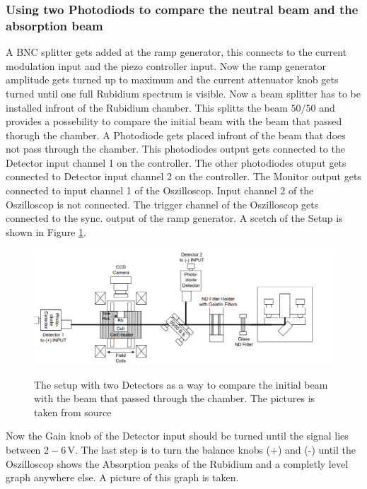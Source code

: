 \subsubsection{Using two Photodiods to compare the neutral beam and the absorption beam}
\label{sec:absorption_spectrum}
A BNC splitter gets added at the ramp generator, this connects to the current modulation input and the piezo controller input.
Now the ramp generator amplitude gets turned up to maximum and the current attenuator knob gets turned until one full Rubidium spectrum is visible.
Now a beam splitter has to be installed infront of the Rubidium chamber.
This splitts the beam $50/50$ and provides a possebility to compare the initial beam with the beam that passed thorugh the chamber.
A Photodiode gets placed infront of the beam that does not pass through the chamber.
This photodiodes output gets connected to the Detector input channel 1 on the controller.
The other photodiodes otuput gets connected to Detector input channel 2 on the controller.
The Monitor output gets connected to input channel 1 of the Oszilloscop.
Input channel 2 of the Oszilloscop is not connected.
The trigger channel of the Oszilloscop gets connected to the sync. output of the ramp generator.
A scetch of the Setup is shown in Figure \ref{fig:setup}.

\begin{figure}
    \centering
    \caption{The setup with two Detectors as a way to compare the initial beam with the beam that passed through the chamber. The pictures is taken from source \cite[16]{anleitung_exp}}
    \includegraphics[width=\textwidth]{content/data/setup}
    \label{fig:setup}
\end{figure}

Now the Gain knob of the Detector input should be turned until the signal lies between $2-6 \,\si{\volt}$.
The last step is to turn the balance knobs (+) and (-) until the Oszilloscop shows the Absorption peaks of the Rubidium and a completly level graph anywhere else.
A picture of this graph is taken.
